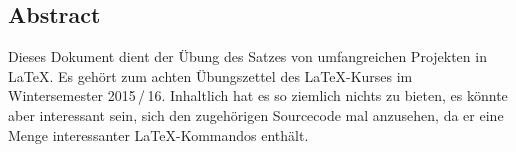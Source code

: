 \documentclass{scrreprt}
\begin{document}
\subsection*{Abstract}
Dieses Dokument dient der Übung des Satzes von umfangreichen Projekten in \LaTeX{}. Es gehört zum achten Übungszettel des \LaTeX-Kurses im Wintersemester 2015\,/\,16. Inhaltlich hat es so ziemlich nichts zu bieten, es könnte aber interessant sein, sich den zugehörigen Sourcecode mal anzusehen, da er eine Menge interessanter \LaTeX-Kommandos enthält.


\end{document}
